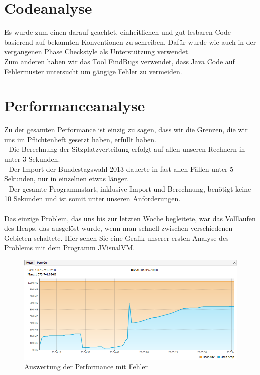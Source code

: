 \documentclass[12pt,a4paper,titlepage]{article}
\begin{document}
\section{Codeanalyse}
Es wurde zum einen darauf geachtet, einheitlichen und gut lesbaren Code basierend auf bekannten Konventionen zu schreiben. Dafür wurde wie auch in der vergangenen Phase Checkstyle als Unterstützung verwendet.\\

Zum anderen haben wir das Tool FindBugs verwendet, dass Java Code auf Fehlermuster untersucht um gängige Fehler zu vermeiden.\\

\section{Performanceanalyse}


Zu der gesamten Performance ist einzig zu sagen, dass wir die Grenzen, die wir uns im Pflichtenheft gesetzt haben, erfüllt haben.\\
- Die Berechnung der Sitzplatzverteilung erfolgt auf allen unseren Rechnern in unter 3 Sekunden.\\
- Der Import der Bundestagswahl 2013 dauerte in fast allen Fällen unter 5 Sekunden, nur in einzelnen etwas länger.\\
- Der gesamte Programmstart, inklusive Import und Berechnung, benötigt keine 10 Sekunden und ist somit unter unseren Anforderungen. \\
\\
Das einzige Problem, das uns bis zur letzten Woche begleitete, war das Volllaufen des Heaps, das ausgelöst wurde, wenn man schnell zwischen verschiedenen Gebieten schaltete. Hier sehen Sie eine Grafik unserer ersten Analyse des Problems mit dem Programm JVisualVM.\\
\begin{figure}[!ht]
\centering
\includegraphics[scale=0.7]{mitFehler.png} \caption{Auswertung der Performance mit Fehler}
\end{figure}
\end{document}
